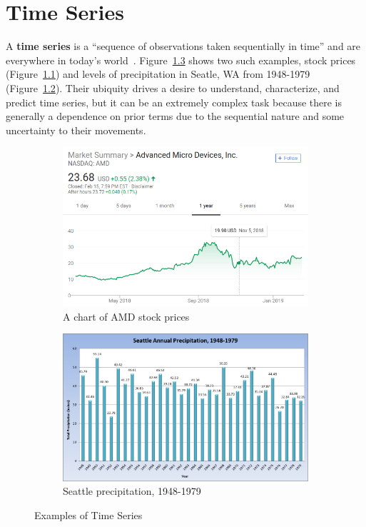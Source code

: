 \documentclass[oneside,12pt,openany]{book}
\begin{document}
	\chapter{Time Series}
	
	A \textbf{time series} is a ``sequence of observations taken sequentially in time'' and are everywhere in today's world~\cite{Box}. Figure~\ref{fig:TimeSeriesExamples} shows two such examples, stock prices (Figure~\ref{fig:AMDChart}) and levels of precipitation in Seatle, WA from 1948-1979 (Figure~\ref{fig:SeattlePrecip}). Their ubiquity drives a desire to understand, characterize, and predict time series, but it can be an extremely complex task because there is generally a dependence on prior terms due to the sequential nature and some uncertainty to their movements.
	
	\begin{figure}[!ht]
		\centering
		\begin{subfigure}[b]{.45\textwidth}
			\includegraphics[width=\textwidth]{images/AMDChart.png}
			\caption{A chart of AMD stock prices}
			\label{fig:AMDChart}
		\end{subfigure}
		\begin{subfigure}[b]{.45\textwidth}
			\includegraphics[width=\textwidth]{images/SeattleRainfall.png}
			\caption{Seattle precipitation, 1948-1979}
			\label{fig:SeattlePrecip}
		\end{subfigure}
		\caption[Examples of Time Series]{Examples of Time Series \footnotemark}
		\label{fig:TimeSeriesExamples}
			
	\end{figure}
\end{document}
